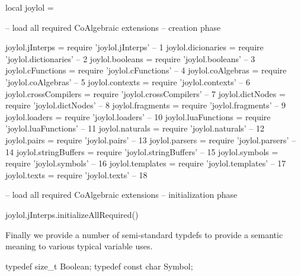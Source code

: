 \startLuaCode
local joylol = { }

-- load all required CoAlgebraic extensions -- creation phase

joylol.jInterps       = require 'joylol.jInterps'       --  1
joylol.dicionaries    = require 'joylol.dictionaries'   --  2
joylol.booleans       = require 'joylol.booleans'       --  3
joylol.cFunctions     = require 'joylol.cFunctions'     --  4
joylol.coAlgebras     = require 'joylol.coAlgebras'     --  5
joylol.contexts       = require 'joylol.contexts'       --  6
joylol.crossCompilers = require 'joylol.crossCompilers' --  7
joylol.dictNodes      = require 'joylol.dictNodes'      --  8
joylol.fragments      = require 'joylol.fragments'      --  9
joylol.loaders        = require 'joylol.loaders'        -- 10
joylol.luaFunctions   = require 'joylol.luaFunctions'   -- 11
joylol.naturals       = require 'joylol.naturals'       -- 12
joylol.pairs          = require 'joylol.pairs'          -- 13
joylol.parsers        = require 'joylol.parsers'        -- 14
joylol.stringBuffers  = require 'joylol.stringBuffers'  -- 15
joylol.symbols        = require 'joylol.symbols'        -- 16
joylol.templates      = require 'joylol.templates'      -- 17
joylol.texts          = require 'joylol.texts'          -- 18

-- load all required CoAlgebraic extensions -- initialization phase

joylol.jInterps.initializeAllRequired()

\stopLuaCode

Finally we provide a number of semi-standard typdefs to provide a semantic 
meaning to various typical variable uses. 

\startCHeader
typedef size_t     Boolean;
typedef const char Symbol;
\stopCHeader
